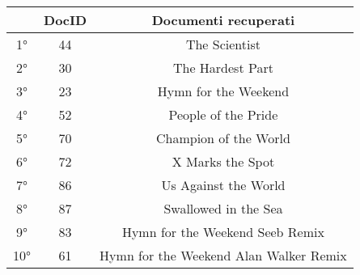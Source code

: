 \documentclass{article}
\begin{document}
\begin{table}[h!]
\centering
    \begin{tabular}{|c|c|c|}
    \hline
    & DocID & Documenti recuperati\\
    \hline
    1° & 44 & The Scientist\\
    \hline
    2° & 30 & The Hardest Part\\
    \hline
    3° & 23 & Hymn for the Weekend\\
    \hline
    4° & 52 & People of the Pride\\
    \hline
    5° & 70 & Champion of the World\\
    \hline
    6° & 72 & X Marks the Spot\\
    \hline
    7° & 86 & Us Against the World\\
    \hline
    8° & 87 & Swallowed in the Sea\\
    \hline
    9° & 83 & Hymn for the Weekend Seeb Remix\\
    \hline
    10° & 61 & Hymn for the Weekend Alan Walker Remix\\
    \hline
\end{tabular}
\end{table}

\iffalse
    \begin{itemize}
    \item \textit{\textbf{filename: "A Sky Full Of Stars"}}. Questa \textit{PhraseQuery}, caratterizzata anche da lettere maiuscole, è stata utilizzata per testare che le maiuscole vengano correttamente ignorate, poiché sia per il filename che per il content, i vari termini sono stati indicizzati con tutte le lettere minuscole.
    \item \textit{\textbf{filename: "a sky full of stars"}}. In questo caso si è testato, tramite una \textit{PhraseQuery} con solo minuscole, che il risultato della query precedente fosse uguale alla query in questione.
    \item \textit{\textbf{filename: -sky +full}}. La \textit{TermQuery} corrente è caratterizzata da simboli posti come prefisso dei singoli termini e in questo caso la query, grazie al \textit{QueryParser}, viene riconosciuta per eseguire una ricerca nel corpus dei file cui titolo presenta necessariamente "full", ma che non deve contenere "sky".
    \item \textit{\textbf{filename: LOVE}}. Si è testata l'indipendenza dalle maiuscole anche quando viene passato un solo termine, quindi per verificare che i documenti trovati siano relativi a file cui nome contiene la stessa parola in qualsiasi formato.
    \item \textit{\textbf{filename: The Scie}}. Per verificare la correttezza del sistema di ranking e di ricerca, è stato controllato che, passato un termine troncato, vengano comunque trovati i file cui nome include parole "vicine" al termine cercato. Si noti che, non avendo ignorato parole comuni come "The", vengono anche riportati tanti altri documenti, ma grazie al ranking vengono valutati meno del file ricercato, cioè \textit{The Scientist.txt}
\end{itemize}
\fi
\end{document}
